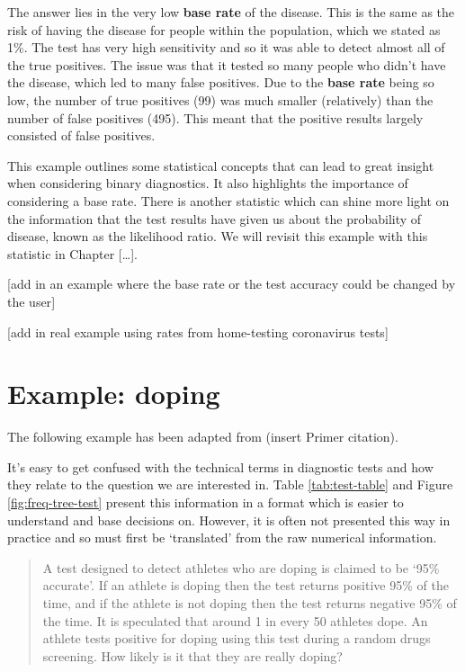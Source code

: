 \documentclass[
]{book}
\begin{document}
The answer lies in the very low \textbf{base rate} of the disease. This is the same as the risk of having the disease for people within the population, which we stated as 1\%. The test has very high sensitivity and so it was able to detect almost all of the true positives. The issue was that it tested so many people who didn't have the disease, which led to many false positives. Due to the \textbf{base rate} being so low, the number of true positives (99) was much smaller (relatively) than the number of false positives (495). This meant that the positive results largely consisted of false positives.

This example outlines some statistical concepts that can lead to great insight when considering binary diagnostics. It also highlights the importance of considering a base rate. There is another statistic which can shine more light on the information that the test results have given us about the probability of disease, known as the likelihood ratio. We will revisit this example with this statistic in Chapter {[}\ldots{]}.

{[}add in an example where the base rate or the test accuracy could be changed by the user{]}

{[}add in real example using rates from home-testing coronavirus tests{]}

\hypertarget{example-doping}{%
\section{Example: doping}\label{example-doping}}

The following example has been adapted from (insert Primer citation).

It's easy to get confused with the technical terms in diagnostic tests and how they relate to the question we are interested in. Table \ref{tab:test-table} and Figure \ref{fig:freq-tree-test} present this information in a format which is easier to understand and base decisions on. However, it is often not presented this way in practice and so must first be `translated' from the raw numerical information.

\begin{quote}
A test designed to detect athletes who are doping is claimed to be `95\% accurate'. If an athlete is doping then the test returns positive 95\% of the time, and if the athlete is not doping then the test returns negative 95\% of the time. It is speculated that around 1 in every 50 athletes dope. An athlete tests positive for doping using this test during a random drugs screening. How likely is it that they are really doping?
\end{quote}
\end{document}
